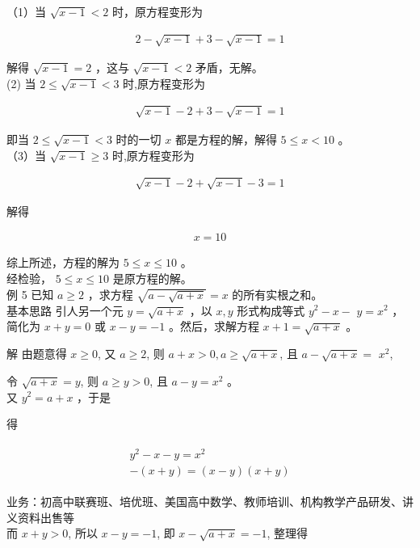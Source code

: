 \documentclass[10pt]{article}
\begin{document}
（1）当 $\sqrt{x-1}<2$ 时，原方程变形为

\begin{align*}
2-\sqrt{x-1}+3-\sqrt{x-1}=1
\end{align*}

解得 $\sqrt{x-1}=2$ ，这与 $\sqrt{x-1}<2$ 矛盾，无解。\\
(2) 当 $2 \leqslant \sqrt{x-1}<3$ 时,原方程变形为

\begin{align*}
\sqrt{x-1}-2+3-\sqrt{x-1}=1
\end{align*}

即当 $2 \leqslant \sqrt{x-1}<3$ 时的一切 $x$ 都是方程的解，解得 $5 \leqslant x<10$ 。\\
（3）当 $\sqrt{x-1} \geqslant 3$ 时,原方程变形为

\begin{align*}
\sqrt{x-1}-2+\sqrt{x-1}-3=1
\end{align*}

解得

\begin{align*}
x=10
\end{align*}

综上所述，方程的解为 $5 \leqslant x \leqslant 10$ 。\\
经检验， $5 \leqslant x \leqslant 10$ 是原方程的解。\\
例 5 已知 $a \geqslant 2$ ，求方程 $\sqrt{a-\sqrt{a+x}}=x$ 的所有实根之和。\\
基本思路 引人另一个元 $y=\sqrt{a+x}$ ，以 $x, y$ 形式构成等式 $y^{2}-x-$ $y=x^{2}$ ，简化为 $x+y=0$ 或 $x-y=-1$ 。然后，求解方程 $x+1=\sqrt{a+x}$ 。

解 由题意得 $x \geqslant 0$, 又 $a \geqslant 2$, 则 $a+x>0, a \geqslant \sqrt{a+x}$, 且 $a-\sqrt{a+x}=$ $x^{2}$,

令 $\sqrt{a+x}=y$, 则 $a \geqslant y>0$, 且 $a-y=x^{2}$ 。\\
又 $y^{2}=a+x$ ，于是

得

\begin{align*}
\begin{gathered}
y^{2}-x-y=x^{2} \\
-(x+y)=(x-y)(x+y)
\end{gathered}
\end{align*}

业务：初高中联赛班、培优班、美国高中数学、教师培训、机构教学产品研发、讲义资料出售等\\
而 $x+y>0$, 所以 $x-y=-1$, 即 $x-\sqrt{a+x}=-1$, 整理得
\end{document}
